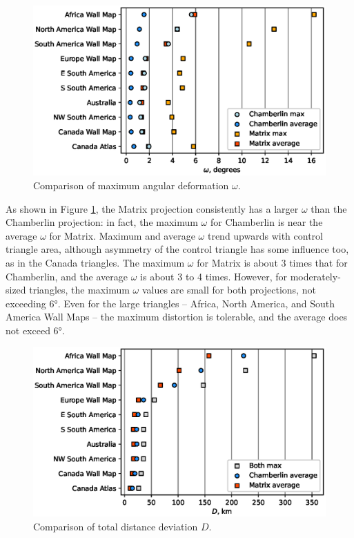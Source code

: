 \documentclass[]{interact}
\begin{document}
\begin{figure}
  \includegraphics[width=\textwidth]{omegaplot}
  \caption{Comparison of maximum angular deformation $\omega$.}
  \label{fig:omegap}
\end{figure}

As shown in Figure \ref{fig:omegap}, the Matrix projection consistently has a
larger $\omega$ than the Chamberlin projection: in fact, the maximum $\omega$
for Chamberlin is near the average $\omega$ for Matrix. Maximum and average
$\omega$ trend upwards with control triangle area, although asymmetry of the
control triangle has some influence too, as in the Canada triangles. The
maximum $\omega$ for Matrix is about 3 times that for Chamberlin, and the
average $\omega$ is about 3 to 4 times. However, for moderately-sized triangles,
the maximum $\omega$ values are small for both projections, not exceeding 6°.
Even for the large triangles -- Africa, North America, and South America Wall
Maps -- the maximum distortion is tolerable, and the average does not exceed 6°.

\begin{figure}
  \includegraphics[width=\textwidth]{distanceplot}
  \caption{Comparison of total distance deviation $D$.}
  \label{fig:distancep}
\end{figure}
\end{document}
